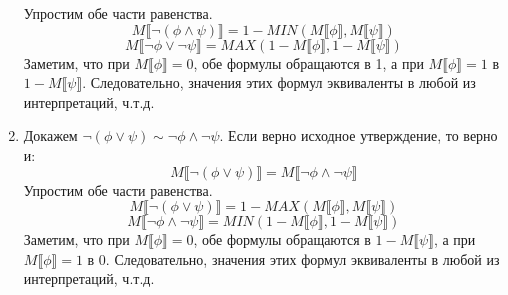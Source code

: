 \documentclass{article}
\begin{document}
\begin{enumerate}
        Упростим обе части равенства.
        \[
            M \llbracket \neg (\phi \land \psi) \rrbracket 
            = 1 - MIN(M \llbracket \phi \rrbracket, M \llbracket \psi \rrbracket)
        \]
        \[
            M \llbracket \neg \phi \lor \neg \psi \rrbracket
            = MAX(1 - M \llbracket \phi \rrbracket, 1 - M \llbracket \psi \rrbracket)
        \]
        Заметим, что при \(M \llbracket \phi \rrbracket = 0\), обе формулы обращаются в 1, 
        а при \(M \llbracket \phi \rrbracket = 1\) в \(1 - M \llbracket \psi \rrbracket\).
        Следовательно, значения этих формул эквиваленты в любой из интерпретаций, ч.т.д.
    \item
        Докажем \(\neg (\phi \lor \psi) \sim \neg \phi \land \neg \psi\).
        Если верно исходное утверждение, то верно и:
        \[M \llbracket \neg (\phi \lor \psi) \rrbracket 
        = M \llbracket \neg \phi \land \neg \psi \rrbracket\]
        Упростим обе части равенства.
        \[
            M \llbracket \neg (\phi \lor \psi) \rrbracket 
            = 1 - MAX(M \llbracket \phi \rrbracket, M \llbracket \psi \rrbracket)
        \]
        \[
            M \llbracket \neg \phi \land \neg \psi \rrbracket
            = MIN(1 - M \llbracket \phi \rrbracket, 1 - M \llbracket \psi \rrbracket)
        \]
        Заметим, что при \(M \llbracket \phi \rrbracket = 0\), 
        обе формулы обращаются в \(1 - M \llbracket \psi \rrbracket\), 
        а при \(M \llbracket \phi \rrbracket = 1\) в 0.
        Следовательно, значения этих формул эквиваленты в любой из интерпретаций, ч.т.д.
\end{enumerate}
\end{document}

